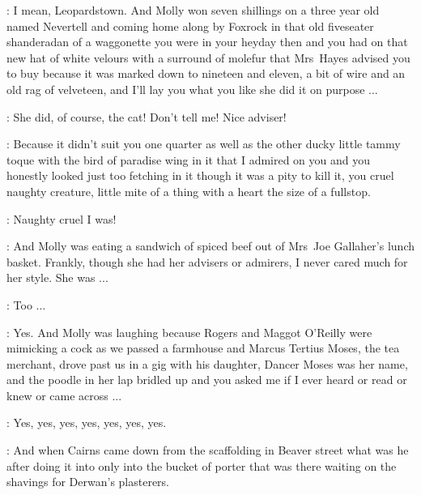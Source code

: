\Bloom:
I mean, Leopardstown.
And Molly won seven shillings on a three year old named Nevertell
and coming home along by Foxrock
in that old fiveseater shanderadan of a waggonette
you were in your heyday then and
you had on that new hat of white velours with a surround of molefur that Mrs~Hayes
advised you to buy because it was marked down to nineteen and eleven,
a bit of wire and an old rag of velveteen,
and I'll lay you what you like she did it on purpose ...

\MrsBreen:
She did, of course, the cat!
Don't tell me! Nice adviser!

\Bloom:
Because it didn't suit you one quarter as well as
the other ducky little tammy toque with the bird of paradise wing in it
that I admired on you and you honestly looked just too fetching in it
though it was a pity to kill it, you cruel naughty creature,
little mite of a thing with a heart the size of a
fullstop.%

\MrsBreen:
Naughty cruel I was!

\Bloom:
And Molly was eating a sandwich of spiced beef
out of Mrs~Joe Gallaher's lunch basket.
Frankly, though she had her advisers or admirers,
I never cared much for her style.
She was ...

\MrsBreen:
Too ...

\Bloom:
Yes.
And Molly was laughing because Rogers and Maggot O'Reilly
were mimicking a cock as we passed a farmhouse and
Marcus Tertius Moses, the tea merchant,
drove past us in a gig with his daughter,
Dancer Moses was her name,
and the poodle in her lap bridled up
and you asked me if I ever heard or read or knew or came across ...

\MrsBreen:
Yes, yes, yes, yes, yes, yes, yes.


\Gaffer:
And when Cairns came down from the scaffolding in Beaver street
what was he after doing it
into only into the bucket of porter that was there
waiting on the shavings for Derwan's plasterers.

